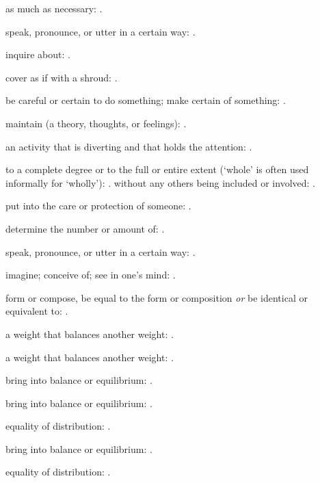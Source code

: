   as much as necessary: .

  speak, pronounce, or utter in a certain way: .

  inquire about: .

  cover as if with a shroud: .

  be careful or certain to do something; make certain of something: .

  maintain (a theory, thoughts, or feelings): .

  an activity that is diverting and that holds the attention: .

  to a complete degree or to the full or entire extent (`whole' is often used informally for `wholly'): . without any others being included or involved: .

  put into the care or protection of someone: .

  determine the number or amount of: .

  speak, pronounce, or utter in a certain way: .

  imagine; conceive of; see in one's mind: .

  form or compose, be equal to the form or composition \textit{or} be identical or equivalent to: .

  a weight that balances another weight: .

  a weight that balances another weight: .

  bring into balance or equilibrium: .

  bring into balance or equilibrium: .

  equality of distribution: .

  bring into balance or equilibrium: .

  equality of distribution: .

